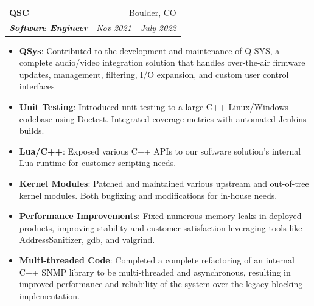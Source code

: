 \documentclass[letterpaper,11pt]{article}
\makeatletter
\newcommand{\resumeItem}[2]{
	\item\small{
		\textbf{#1}{: #2 \vspace{-2pt}}
	}
}
\newcommand{\resumeSubheading}[4]{
	\vspace{-1pt}\item
	\begin{tabular*}{0.97\textwidth}{l@{\extracolsep{\fill}}r}
		\textbf{#1} & #2 \\
		\textit{\small#3} & \textit{\small #4} \\
	\end{tabular*}\vspace{-5pt}
}
\newcommand{\resumeItemListStart}{\begin{itemize}}
\newcommand{\resumeItemListEnd}{\end{itemize}\vspace{-5pt}}
\makeatother
\begin{document}
	\resumeSubheading{QSC}{Boulder, CO}{\textbf{Software Engineer}}{Nov 2021 - July 2022}
	\resumeItemListStart
	\resumeItem{QSys}{Contributed to the development and maintenance of Q-SYS, a complete audio/video integration solution that handles over-the-air firmware updates, management, filtering, I/O expansion, and custom user control interfaces}
	\resumeItem{Unit Testing}{Introduced unit testing to a large C++ Linux/Windows codebase using Doctest. Integrated coverage metrics with automated Jenkins builds.}
	\resumeItem{Lua/C++}{Exposed various C++ APIs to our software solution's internal Lua runtime for customer scripting needs.}
	\resumeItem{Kernel Modules}{Patched and maintained various upstream and out-of-tree kernel modules. Both bugfixing and modifications for in-house needs.}
	\resumeItem{Performance Improvements}{Fixed numerous memory leaks in deployed products, improving stability and customer satisfaction leveraging tools like AddressSanitizer, gdb, and valgrind.}
	\resumeItem{Multi-threaded Code}{Completed a complete refactoring of an internal C++ SNMP library to be multi-threaded and asynchronous, resulting in improved performance and reliability of the system over the legacy blocking implementation.}
	\resumeItemListEnd
	
	
	
\end{document}
